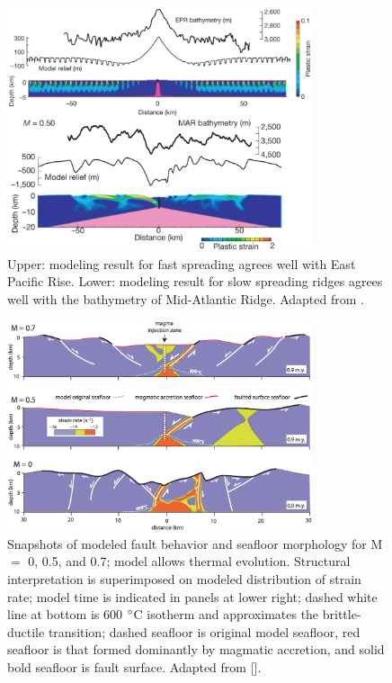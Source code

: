\documentclass[draft,gc]{agutex}
\begin{document}
\begin{figure}[h]
\noindent\includegraphics[width=0.8\textwidth]{./Figures/fig_Intro5_1.eps}
 \caption[2D model results adapted from \citep{Buck2005}.]{Upper: modeling result for fast spreading agrees well with East Pacific Rise. Lower: modeling result for slow spreading ridges agrees well with the bathymetry of Mid-Atlantic Ridge. Adapted from \citep{Buck2005}.}
 \label{fig_Intro5_1}
\end{figure}

\begin{figure}[h]
\noindent\includegraphics[width=0.8\textwidth]{./Figures/fig_Intro_Tucholke2008.eps}
 \caption[2D model results adapted from \citep{Tucholke2008,Whitney2012}.]{Snapshots of modeled fault behavior and seafloor morphology for M $=$ 0, 0.5, and 0.7; model allows thermal evolution. Structural interpretation is superimposed on modeled distribution of strain rate; model time is indicated in panels at lower right; dashed white line at bottom is 600 $\degree$C isotherm and approximates the brittle-ductile transition; dashed seafloor is original model seafloor, red seafloor is that formed dominantly by magmatic accretion, and solid bold seafloor is fault surface. Adapted from [\citealp{Tucholke2008,Whitney2012}].}
 \label{fig_Intro6_1}
\end{figure}
\end{document}
